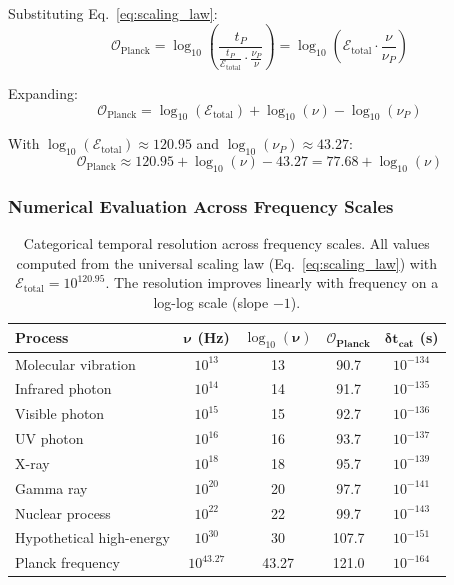 \documentclass[twocolumn,10pt]{article}
\theoremstyle{remark}
\begin{document}
Substituting Eq.~\eqref{eq:scaling_law}:
\begin{equation}
    \mathcal{O}_{\text{Planck}} = \log_{10}\left(\frac{t_P}{\frac{t_P}{\mathcal{E}_{\text{total}}} \cdot \frac{\nu_P}{\nu}}\right) = \log_{10}\left(\mathcal{E}_{\text{total}} \cdot \frac{\nu}{\nu_P}\right)
    \label{eq:orders_derivation}
\end{equation}

Expanding:
\begin{equation}
    \mathcal{O}_{\text{Planck}} = \log_{10}(\mathcal{E}_{\text{total}}) + \log_{10}(\nu) - \log_{10}(\nu_P)
    \label{eq:orders_expanded}
\end{equation}

With $\log_{10}(\mathcal{E}_{\text{total}}) \approx 120.95$ and $\log_{10}(\nu_P) \approx 43.27$:
\begin{equation}
    \mathcal{O}_{\text{Planck}} \approx 120.95 + \log_{10}(\nu) - 43.27 = 77.68 + \log_{10}(\nu)
    \label{eq:orders_numerical}
\end{equation}

\subsubsection{Numerical Evaluation Across Frequency Scales}

\begin{table}[h]
\centering
\begin{tabular}{lcccc}
\hline
\textbf{Process} & $\boldsymbol{\nu}$ \textbf{(Hz)} & $\log_{10}(\boldsymbol{\nu})$ & $\boldsymbol{\mathcal{O}_{\text{Planck}}}$ & $\boldsymbol{\delta t_{\text{cat}}}$ \textbf{(s)} \\
\hline
Molecular vibration & $10^{13}$ & 13 & 90.7 & $10^{-134}$ \\
Infrared photon & $10^{14}$ & 14 & 91.7 & $10^{-135}$ \\
Visible photon & $10^{15}$ & 15 & 92.7 & $10^{-136}$ \\
UV photon & $10^{16}$ & 16 & 93.7 & $10^{-137}$ \\
X-ray & $10^{18}$ & 18 & 95.7 & $10^{-139}$ \\
Gamma ray & $10^{20}$ & 20 & 97.7 & $10^{-141}$ \\
Nuclear process & $10^{22}$ & 22 & 99.7 & $10^{-143}$ \\
Hypothetical high-energy & $10^{30}$ & 30 & 107.7 & $10^{-151}$ \\
Planck frequency & $10^{43.27}$ & 43.27 & 121.0 & $10^{-164}$ \\
\hline
\end{tabular}
\caption{Categorical temporal resolution across frequency scales. All values computed from the universal scaling law (Eq.~\ref{eq:scaling_law}) with $\mathcal{E}_{\text{total}} = 10^{120.95}$. The resolution improves linearly with frequency on a log-log scale (slope $-1$).}
\label{tab:scaling_validation}
\end{table}
\end{document}
